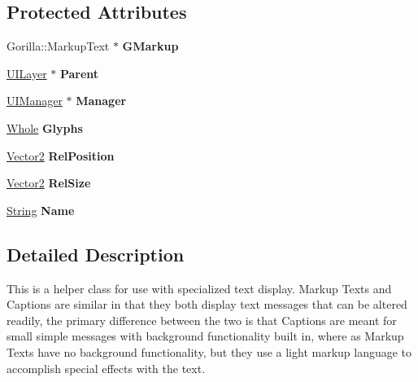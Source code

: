 \subsection*{Protected Attributes}
\begin{DoxyCompactItemize}
\item 
\hypertarget{classphys_1_1UI_1_1MarkupText_a620d8d94f82242d452776e90f3b01982}{
Gorilla::MarkupText $\ast$ {\bfseries GMarkup}}
\label{d7/d23/classphys_1_1UI_1_1MarkupText_a620d8d94f82242d452776e90f3b01982}

\item 
\hypertarget{classphys_1_1UI_1_1MarkupText_afe6c68ba31cf4861abe562d8385c4382}{
\hyperlink{classphys_1_1UILayer}{UILayer} $\ast$ {\bfseries Parent}}
\label{d7/d23/classphys_1_1UI_1_1MarkupText_afe6c68ba31cf4861abe562d8385c4382}

\item 
\hypertarget{classphys_1_1UI_1_1MarkupText_a0c2c2d00a0cc3fc18929996ca8469efe}{
\hyperlink{classphys_1_1UIManager}{UIManager} $\ast$ {\bfseries Manager}}
\label{d7/d23/classphys_1_1UI_1_1MarkupText_a0c2c2d00a0cc3fc18929996ca8469efe}

\item 
\hypertarget{classphys_1_1UI_1_1MarkupText_abbb2984fb489b7470e04b6e5c9dc0217}{
\hyperlink{namespacephys_a460f6bc24c8dd347b05e0366ae34f34a}{Whole} {\bfseries Glyphs}}
\label{d7/d23/classphys_1_1UI_1_1MarkupText_abbb2984fb489b7470e04b6e5c9dc0217}

\item 
\hypertarget{classphys_1_1UI_1_1MarkupText_af4fce680f510b38537f7b1db0eda8598}{
\hyperlink{classphys_1_1Vector2}{Vector2} {\bfseries RelPosition}}
\label{d7/d23/classphys_1_1UI_1_1MarkupText_af4fce680f510b38537f7b1db0eda8598}

\item 
\hypertarget{classphys_1_1UI_1_1MarkupText_a184fb78af719fb52fcf0408501738cdc}{
\hyperlink{classphys_1_1Vector2}{Vector2} {\bfseries RelSize}}
\label{d7/d23/classphys_1_1UI_1_1MarkupText_a184fb78af719fb52fcf0408501738cdc}

\item 
\hypertarget{classphys_1_1UI_1_1MarkupText_ab56e816bda785c058f9440e7aebd52cb}{
\hyperlink{namespacephys_aa03900411993de7fbfec4789bc1d392e}{String} {\bfseries Name}}
\label{d7/d23/classphys_1_1UI_1_1MarkupText_ab56e816bda785c058f9440e7aebd52cb}

\end{DoxyCompactItemize}


\subsection{Detailed Description}
This is a helper class for use with specialized text display. Markup Texts and Captions are similar in that they both display text messages that can be altered readily, the primary difference between the two is that Captions are meant for small simple messages with background functionality built in, where as Markup Texts have no background functionality, but they use a light markup language to accomplish special effects with the text. 

